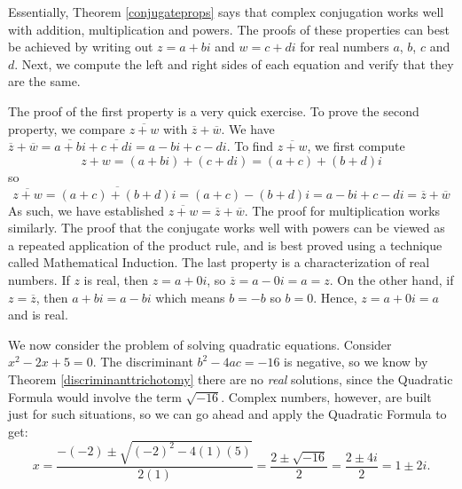 \medskip

Essentially, Theorem \ref{conjugateprops} says that complex conjugation works well with addition, multiplication and powers.  The proofs of these properties can best be achieved by writing out $z = a+bi$ and $w = c+di$ for real numbers $a$, $b$, $c$ and $d$.   Next, we compute the left and right sides of each equation and verify that they are the same.  

\smallskip

The proof of the first property is a very quick exercise.  To prove the second property, we compare $\overline{z+w}$ with $\overline{z} + \overline{w}$.  We have $\overline{z} + \overline{w} = \overline{a+bi} + \overline{c+di}  = a-bi + c-di$.  To find $\overline{z+w}$, we first compute \[z+w = (a+bi) + (c+di) = (a+c)+(b+d)i\] so \[\overline{z+w} = \overline{(a+c)+(b+d)i} = (a+c) - (b+d)i = a - bi + c - di = \overline{z} + \overline{w}\]  As such, we have established  $\overline{z+w} = \overline{z}+\overline{w}$. The proof for multiplication works similarly.  The proof that the conjugate works well with powers can be viewed as a repeated application of the product rule, and is best proved using a technique called Mathematical Induction.  The last property is a characterization of real numbers.  If $z$ is real, then $z = a + 0i$, so $\overline{z} = a - 0i = a = z$.  On the other hand, if $z=\overline{z}$, then $a+bi = a - bi$ which means $b=-b$ so $b=0$.  Hence, $z = a +0i = a$ and is real.



\medskip

We now consider the problem of solving quadratic equations. Consider  $x^2-2x+5 = 0$. The discriminant $b^2 - 4ac = -16$ is negative, so we know by Theorem \ref{discriminanttrichotomy} there are no \textit{real} solutions, since the Quadratic Formula would involve the term $\sqrt{-16}$.  Complex numbers, however, are built just for such situations, so we can go ahead and apply the Quadratic Formula to get:
 \[ 
x = \dfrac{-(-2) \pm \sqrt{(-2)^2-4(1)(5)}}{2(1)} = \dfrac{2 \pm \sqrt{-16}}{2} = \dfrac{2 \pm 4i}{2} = 1 \pm 2i.
\]  

